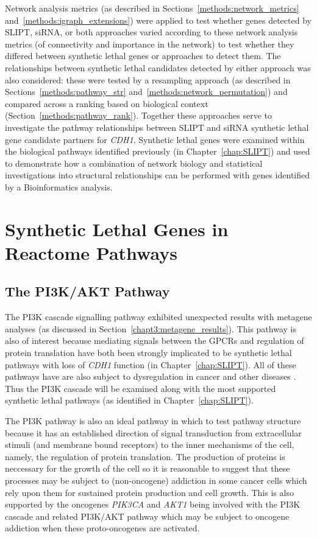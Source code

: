 Network analysis metrics (as described in Sections~\ref{methods:network_metrics} and~\ref{methods:igraph_extensions}) were applied to test whether genes detected by SLIPT, siRNA, or both approaches varied according to these network analysis metrics (of connectivity and importance in the network) to test whether they differed between synthetic lethal genes or approaches to detect them. The relationships between synthetic lethal candidates detected by either approach was also considered: these were tested by a resampling approach (as described in Sections~\ref{methods:pathway_str} and~\ref{methods:network_permutation}) and compared across a ranking based on biological context (Section~\ref{methods:pathway_rank}). Together these approaches serve to investigate the pathway relationships between SLIPT and siRNA synthetic lethal gene candidate partners for \textit{CDH1}. Synthetic lethal genes were examined within the biological pathways identified previously (in Chapter~\ref{chap:SLIPT}) and used to demonstrate how a combination of network biology and statistical investigations into structural relationships can be performed with genes identified by a Bioinformatics analysis.

\FloatBarrier

\section{Synthetic Lethal Genes in Reactome Pathways} \label{chapt4:SL_Genes}

\FloatBarrier

\subsection{The PI3K/AKT Pathway}  \label{chapt4:SL_Genes_PI3K}

The \acrfull{PI3K} cascade signalling pathway exhibited unexpected results with metagene analyses (as discussed in Section~\ref{chapt3:metagene_results}). This pathway is also of interest because mediating signals between the \glspl{GPCR} and regulation of protein translation have both been strongly implicated to be synthetic lethal pathways with loss of \textit{CDH1} function (in Chapter~\ref{chap:SLIPT}). All of these pathways have are also subject to dysregulation in cancer and other diseases \cite{Gao2015}. Thus the PI3K cascade will be examined along with the most supported synthetic lethal pathways (as identified in Chapter~\ref{chap:SLIPT}).

The \gls{PI3K} pathway is also an ideal pathway in which to test pathway structure because it has an established direction of signal transduction from extracellular stimuli (and membrane bound receptors) to the inner mechanisms of the cell, namely, the regulation of protein translation. The production of proteins is neccessary for the growth of the cell so it is reasonable to suggest that these processes may be subject to (non-oncogene) addiction in some cancer cells which rely upon them for sustained protein production and cell growth. This is also supported by the oncogenes \textit{PIK3CA} and \textit{AKT1} being involved with the PI3K cascade and related PI3K/AKT pathway which may be subject to oncogene addiction when these proto-oncogenes are activated.

